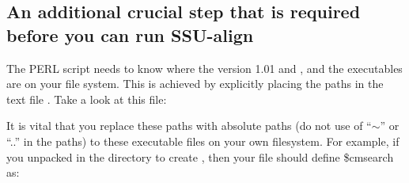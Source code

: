 \subsection{An additional crucial step that is required before you
can run SSU-align}

The  PERL script needs to know where the
 version 1.01  and , and
the   executables are on your file
system. This is achieved by explicitly placing the paths in the text
file . Take a look at this file:


It is vital that you replace these paths with absolute paths (do not 
use of ``$\sim$'' or ``..'' in the paths) to these executable files on your own
filesystem. For example, if you unpacked  in the 
directory  to create
, then your  file
should define \$cmsearch as: 



